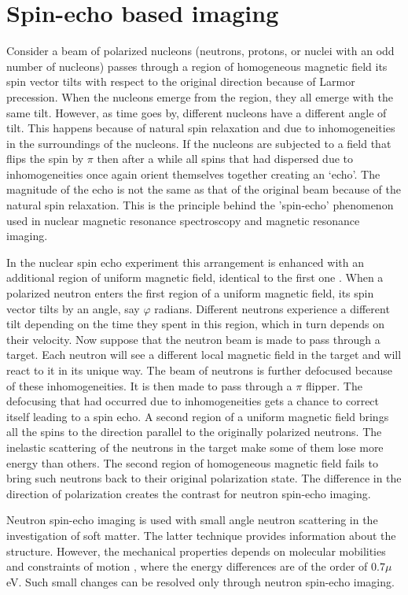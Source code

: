 \documentclass{article}
\numberwithin{equation}{section}
\begin{document}
\section{Spin-echo based imaging}\label{s12}
Consider a beam of polarized nucleons (neutrons, protons, or nuclei with an odd
number of nucleons) passes through a region of homogeneous magnetic field its
spin vector tilts with respect to the original direction because of Larmor
precession. When the nucleons emerge from the region, they all emerge with the
same tilt. However, as time goes by, different nucleons have a different angle
of tilt. This happens because of natural spin relaxation and due to 
inhomogeneities in the surroundings of the nucleons. If the nucleons are 
subjected to a field that flips the spin by $\pi$ then after a while all spins
that had dispersed due to inhomogeneities once again orient themselves together
creating an `echo'. The magnitude of the echo is not the same as that of the
original beam because of the natural spin relaxation. This is the principle
behind the 'spin-echo' phenomenon used in nuclear magnetic resonance 
spectroscopy and magnetic resonance imaging.

In the nuclear spin echo experiment this arrangement is enhanced with an 
additional region of uniform magnetic field, identical to the first one
\cite{mezei1972neutron}. When a polarized neutron enters the first region
of a uniform magnetic field, its spin vector tilts by an angle, say $\varphi$
radians. Different neutrons experience a different tilt depending on the 
time they spent in this region, which in turn depends on their velocity. Now
suppose that the neutron beam is made to pass through a target. Each neutron
will see a different local magnetic field in the target and will react to it
in its unique way. The beam of neutrons is further defocused because of these
inhomogeneities. It is then made to pass through a $\pi$ flipper. The 
defocusing that had occurred due to inhomogeneities gets a chance to correct
itself leading to a spin echo. A second region of a uniform magnetic field
brings all the spins to the direction parallel to the originally polarized
neutrons. The inelastic scattering of the neutrons in the target make some of
them lose more energy than others. The second region of homogeneous magnetic
field fails to bring such neutrons back to their original polarization state.
The difference in the direction of polarization creates the contrast for
neutron spin-echo imaging.

Neutron spin-echo imaging is used with small angle neutron scattering in the
investigation of soft matter. The latter technique provides information about
the structure. However, the mechanical properties depends on molecular 
mobilities and constraints of motion \cite{monkenbusch2007high}, where the
energy differences are of the order of $0.7 \mu$eV. Such small changes can be
resolved only through neutron spin-echo imaging.
\end{document}
